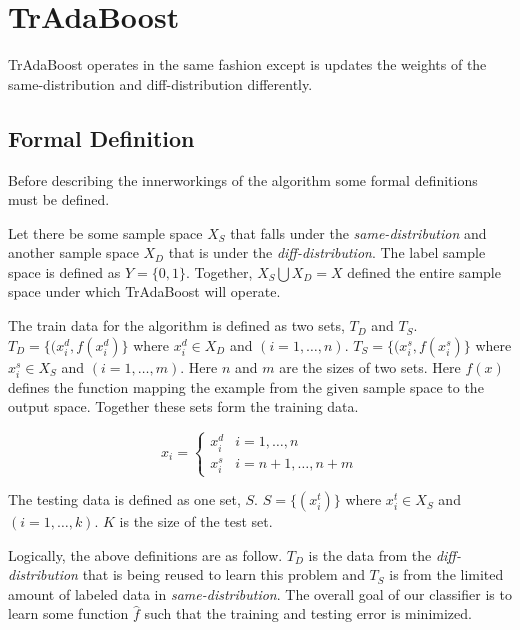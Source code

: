 \documentclass[12pt]{article}
\begin{document}
    \section{TrAdaBoost} \label{boost-tradaboost}
      TrAdaBoost operates in the same fashion except is updates the weights of the same-distribution and
      diff-distribution differently.

      \subsection{Formal Definition} \label{boost-tradaboost-def}
        Before describing the innerworkings of the algorithm some formal definitions must be defined.

        Let there be some sample space $X_S$ that falls under the {\it same-distribution} and another sample space $X_D$
        that is under the {\it diff-distribution}. The label sample space is defined as $Y= \{0,1\}$. Together, $X_S \bigcup X_D = X$
        defined the entire sample space under which TrAdaBoost will operate.

        The train data for the algorithm is defined as two sets, $T_D$ and $T_S$. $T_D = \{(x^d_i, f(x^d_i)\}$ where $x^d_i \in X_D$ and
        $(i = 1, \dots, n)$. $T_S = \{(x^s_i, f(x^s_i)\}$ where $x^s_i \in X_S$ and $(i = 1, \dots, m)$. Here $n$ and $m$ are the sizes of
        two sets. Here $f(x)$ defines the function mapping the example from the given sample space to the output space. Together these sets
        form the training data. \autocite{dai_yang_xue_yu_2007}

        \begin{equation}
          x_i =
          \begin{cases}
            x_i^d        & i = 1, \dots, n \\
            x_i^s        & i = n + 1, \dots, n+m
          \end{cases}
        \end{equation}

        The testing data is defined as one set, $S$. $S = \{(x_i^t)\}$ where $x_i^t \in X_S$ and $(i=1, \dots, k)$. $K$ is the size of 
        the test set. \autocite{dai_yang_xue_yu_2007}

        Logically, the above definitions are as follow. $T_D$ is the data from the {\it diff-distribution} that is being reused to learn 
        this problem and $T_S$ is from the limited amount of labeled data in {\it same-distribution}. The overall goal of our classifier is
        to learn some function $\hat{f}$ such that the training and testing error is minimized.
\end{document}
